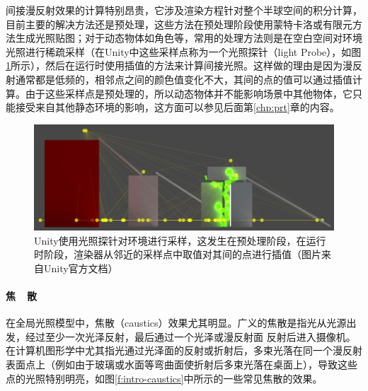 间接漫反射效果的计算特别昂贵，它涉及渲染方程针对整个半球空间的积分计算，目前主要的解决方法还是预处理，这些方法在预处理阶段使用蒙特卡洛或有限元方法生成光照贴图；对于动态物体如角色等，常用的处理方法则是在空白空间对环境光照进行稀疏采样（在Unity中这些采样点称为一个光照探针（light Probe），如图\ref{f:intro-light-probe}所示），然后在运行时使用插值的方法来计算间接光照。这样做的理由是因为漫反射通常都是低频的，相邻点之间的颜色值变化不大，其间的点的值可以通过插值计算。由于这些采样点是预处理的，所以动态物体并不能影响场景中其他物体，它只能接受来自其他静态环境的影响，这方面可以参见后面第\ref{chp:prt}章的内容。

\begin{figure}
\includegraphics[width=\textwidth]{figures/intro/LightProbes}	
\caption{Unity使用光照探针对环境进行采样，这发生在预处理阶段，在运行时阶段，渲染器从邻近的采样点中取值对其间的点进行插值（图片来自Unity官方文档）}
\label{f:intro-light-probe}
\end{figure}




\paragraph{焦~~散}
在全局光照模型中，焦散（caustics）效果尤其明显。广义的焦散是指光从光源出发，经过至少一次光泽反射，最后通过一个光泽或漫反射面 反射后进入摄像机。在计算机图形学中尤其指光通过光泽面的反射或折射后，多束光落在同一个漫反射表面点上（例如由于玻璃或水面等弯曲面使折射后多束光落在桌面上），导致这些点的光照特别明亮，如图\ref{f:intro-caustics}中所示的一些常见焦散的效果。

